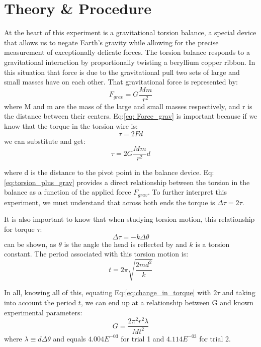 \documentclass[a4paper,12pt,english]{all-in-one} %
\begin{document}
\section*{Theory \& Procedure}
{
At the heart of this experiment is a gravitational torsion balance, a special device that allows us to negate Earth's gravity while allowing for the precise measurement of exceptionally delicate forces. The torsion balance responds to a gravitational interaction by proportionally twisting a beryllium copper ribbon. In this situation that force is due to the gravitational pull two sets of large and small masses have on each other. That gravitational force is represented by:
\begin{equation}\label{eq: Force_grav}
    F_{grav} = G\frac{Mm}{r^2}
\end{equation}
where M and m are the mass of the large and small masses respectively, and
r is the distance between their centers. Eq:\eqref{eq: Force_grav} is important because if we know that the torque in the torsion wire is:
\begin{equation}\label{eq:torsion}
    \tau = 2Fd
\end{equation}
we can substitute and get:
\begin{equation}\label{eq:torsion_plus_grav}
    \tau = 2G\frac{Mm}{r^2}d
\end{equation}

where d is the distance to the pivot point in the balance device. Eq:\eqref {eq:torsion_plus_grav} provides a direct relationship between the torsion in the balance as a function of the applied force $F_{grav}$. To further interpret this experiment, we must understand that across both ends the torque is $\Delta\tau = 2\tau$.

It is also important to know that when studying torsion motion, this relationship for torque $\tau$:
\begin{equation}\label{eq:change_in_torque}
    \Delta\tau = -k\Delta\theta 
\end{equation}
can be shown, as $\theta$ is the angle the head is reflected by and $k$ is a torsion constant. The period associated with this torsion motion is:
\begin{equation}\label{eq:toursion_perios}
    t = 2\pi\sqrt{\frac{2md^2}{k}}
\end{equation}

In all, knowing all of this, equating Eq:\eqref{eq:change_in_torque} with $2\tau$ and taking into account the period $t$, we can end up at a relationship between G and known experimental parameters:
\begin{equation}\label{eq:grav_constant}
   G = \frac{2\pi^2r^2\lambda}{Mt^2}
\end{equation}
where $\lambda \equiv d\Delta\theta$ and equals $4.004E^{-03}$ for trial 1 and $4.114E^{-03}$ for trial 2.

}
\end{document}
